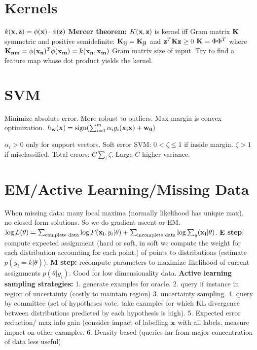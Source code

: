 \section{Kernels}
$k(\mathbf{x}, \mathbf{z}) = \phi(\mathbf{x}) \cdot \phi(\mathbf{z})$
{\bf Mercer theorem:} $K(\mathbf{x}, \mathbf{z})$ is kernel iff Gram matrix $\mathbf{K}$ symmetric and positive semidefinite: $\mathbf{K_{ij}} = \mathbf{K_{ji}}$ and $\mathbf{z}^{T}\mathbf{K}\mathbf{z} \geq 0$
$\mathbf{K} = \Phi\Phi^T$ where $\mathbf{K_{nm}} = \phi(\mathbf{x_n})^T\phi(\mathbf{x_m}) = k(\mathbf{x_n}, \mathbf{x_m})$ Gram matrix size of input. Try to find a feature map whose dot product yields the kernel.


\section{SVM}
Minimize absolute error. More robust to outliers. Max margin is convex optimization.
$h_{\mathbf{w}}(\mathbf{x}) = \text{sign}(\sum_{i=1}^m \alpha_{i}y_{i}(\mathbf{x_{i}}\mathbf{x}) + \mathbf{w_0})$

$\alpha_{i} > 0$ only for support vectors. Soft error SVM: $0 < \zeta \leq 1$ if inside margin. $\zeta > 1$ if misclassified. Total errors: $C \sum_{i} \zeta$. Large $C$ higher variance.

\section{EM/Active Learning/Missing Data}
When missing data: many local maxima (normally likelihood has unique max), no closed form solutions. So we do gradient ascent or EM. $\log L(\theta) = \sum_{\text{complete data}} \log P(\mathbf{x_i}, y_i \vert \theta) + \sum_{\text{incomplete data}} \log \sum_{y} (\mathbf{x_i} \vert \theta)$. {\bf E step}: compute expected assignment (hard or soft, in soft we compute the weight for each distribution accounting for each point.) of points to distributions (estimate $p(y_i = k \vert \theta)$). {\bf M step: } recompute parameters to maximize likelihood of current assignments $p(\theta \vert y_i)$. Good for low dimensionality data. 
{\bf Active learning sampling strategies: } 1. generate examples for oracle. 2. query if instance in region of uncertainty (costly to maintain region) 3. uncertainty sampling. 4. query by committee (set of hypotheses vote. take examples for which KL divergence between distributions predicted by each hypothesis is high). 5. Expected error reduction/ max info gain (consider impact of labelling $\mathbf{x}$ with all labels, measure impact on other examples. 6. Density based (queries far from major concentration of data less useful)
